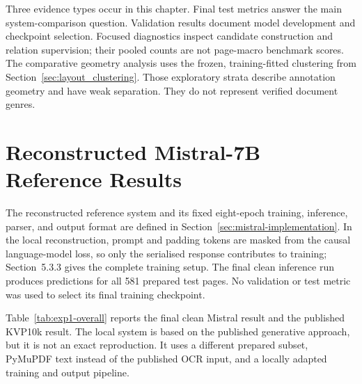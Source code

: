 Three evidence types occur in this chapter. Final test metrics answer the main
system-comparison question. Validation results document model development and
checkpoint selection. Focused diagnostics inspect candidate construction and
relation supervision; their pooled counts are not page-macro benchmark scores.
The comparative geometry analysis uses the frozen, training-fitted clustering
from Section~\ref{sec:layout_clustering}. Those exploratory strata describe annotation geometry and have weak
separation. They do not represent verified document genres.

\section{Reconstructed Mistral-7B Reference Results}
\label{sec:exp1}
\label{sec:res1}

The reconstructed reference system and its fixed eight-epoch training,
inference, parser, and output format are defined in
Section~\ref{sec:mistral-implementation}.
In the local reconstruction, prompt and padding tokens are masked from the
causal language-model loss, so only the serialised response contributes to
training; Section~5.3.3 gives the complete training setup.
The final clean inference run produces
predictions for all 581 prepared test pages. No validation or test metric was
used to select its final training checkpoint.

Table~\ref{tab:exp1-overall} reports the final clean Mistral result and the
published KVP10k result. The local system is based on the published generative
approach, but it is not an exact reproduction. It uses a different prepared
subset, PyMuPDF text instead of the published OCR input, and a locally adapted
training and output pipeline.

